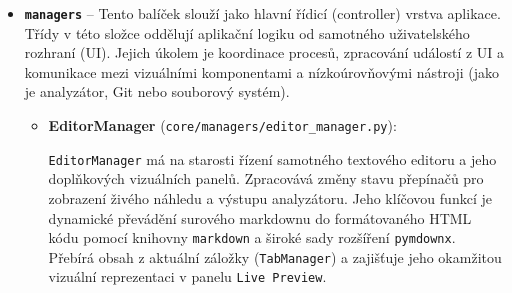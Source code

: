 \documentclass[12pt, a4paper]{article}
\begin{document}
\begin{itemize}
\begin{itemize}
        \item \textbf{FormattingValidator} (\texttt{core/analyzer/formatting\_validator.py}):

        Soustředí kontroly nízkoúrovňového formátování textu. Hlídá liché počty hvězdiček
        (neuzavřený bold \texttt{**} nebo italic \texttt{*}, bullet markery jsou z řádku odfiltrovány),
        obrázky bez alt textu (\texttt{![](url)}), správnou skladbu tabulek a přítomnost
        Unicode \emph{replacement} znaku (\texttt{\textbackslash ufffd}), který indikuje
        poškozené kódování souboru.

        \item \textbf{LinkValidator} (\texttt{core/analyzer/links\_validator.py}):

        Validuje markdown odkazy na úrovni celého projektu pomocí globálního indexu souborů
        (\texttt{project\_index}). Ověřuje, že každý relativní odkaz na \texttt{.md} soubor existuje
        v projektu, že vzájemné odkazy mezi vzory v sekci \emph{Related Patterns} jsou reciproční
        (pokud vzor A odkazuje na vzor B, musí B odkazovat zpět na A) a že popisek odkazu odpovídá
        názvu cílového souboru nebo některému z jeho aliasů uvedených v sekci \emph{Also Known As}.
        Pro indexové šablony lze kontrolu aliasů přeskočit přepínačem \texttt{skip\_alias\_check}.
    \end{itemize}

    \item \textbf{\texttt{managers}} -- Tento balíček slouží jako hlavní řídicí (controller) vrstva aplikace. 
    Třídy v této složce oddělují aplikační logiku od samotného uživatelského rozhraní (UI). 
    Jejich úkolem je koordinace procesů, zpracování událostí z UI a komunikace mezi vizuálními 
    komponentami a nízkoúrovňovými nástroji (jako je analyzátor, Git nebo souborový systém).
    \begin{itemize}
        \item \textbf{EditorManager} (\texttt{core/managers/editor\_manager.py}):
        
        \texttt{EditorManager} má na starosti řízení samotného textového editoru a jeho doplňkových vizuálních panelů. 
        Zpracovává změny stavu přepínačů pro zobrazení živého náhledu a výstupu analyzátoru. Jeho klíčovou funkcí je 
        dynamické převádění surového markdownu do formátovaného HTML kódu pomocí knihovny \texttt{markdown} a 
        široké sady rozšíření \texttt{pymdownx}. Přebírá obsah z aktuální záložky (\texttt{TabManager}) a 
        zajišťuje jeho okamžitou vizuální reprezentaci v panelu \texttt{Live Preview}.


\end{itemize}
\end{itemize}
\end{document}
